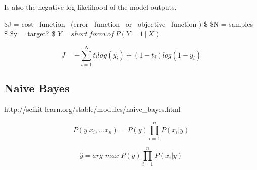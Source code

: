 \documentclass[11pt]{article}
\begin{document}
Is also the negative log-likelihood of the model outputs.

    \$J = cost ~function ~(error ~function ~or ~objective ~function ) \$ \$N
= samples \$ \$y = target? \$ \(Y = short \ form \ of \ P(Y=1 \ | \ X)\)

    \[J = - \sum_{i = 1}^{N} t_{i}log(y_{i}) + (1 - t_{i})log(1 - y_{i})\]

    \hypertarget{naive-bayes}{%
\subsection{Naive Bayes}\label{naive-bayes}}

    http://scikit-learn.org/stable/modules/naive\_bayes.html

    \[P(y|x_{i},...x_{n}) = P(y) \prod_{i=1}^{n} P(x_{i}|y) \]

    \[\hat{y} = arg\;  max\; P(y) \prod_{i=1}^{n} P(x_{i}|y)\]


    
    
    
    
\end{document}
